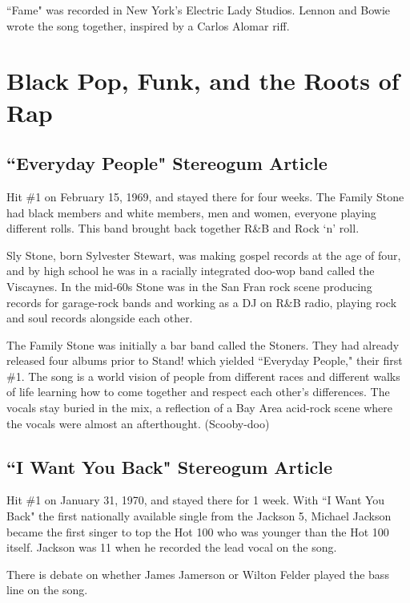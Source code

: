 \documentclass[12pt, a4paper, twoside, openright, titlepage]{book}
\begin{document}
``Fame" was recorded in New York's Electric Lady Studios. Lennon and Bowie wrote the song together, inspired by a Carlos Alomar riff. 



\chapter{Black Pop, Funk, and the Roots of Rap}


\section{``Everyday People" Stereogum Article}

Hit \#1 on February 15, 1969, and stayed there for four weeks. The Family Stone had black members and white members, men and women, everyone playing different rolls. This band brought back together R\&B and Rock `n' roll.

Sly Stone, born Sylvester Stewart, was making gospel records at the age of four, and by high school he was in a racially integrated doo-wop band called the Viscaynes. In the mid-60s Stone was in the San Fran rock scene producing records for garage-rock bands and working as a DJ on R\&B radio, playing rock and soul records alongside each other. 

The Family Stone was initially a bar band called the Stoners. They had already released four albums prior to Stand! which yielded ``Everyday People," their first \#1. The song is a world vision of people from different races and different walks of life learning how to come together and respect each other's differences. The vocals stay buried in the mix, a reflection of a Bay Area acid-rock scene where the vocals were almost an afterthought. (Scooby-doo)



\section{``I Want You Back" Stereogum Article}

Hit \#1 on January 31, 1970, and stayed there for 1 week. With ``I Want You Back" the first nationally available single from the Jackson 5, Michael Jackson became the first singer to top the Hot 100 who was younger than the Hot 100 itself. Jackson was 11 when he recorded the lead vocal on the song.

There is debate on whether James Jamerson or Wilton Felder played the bass line on the song.
\end{document}
